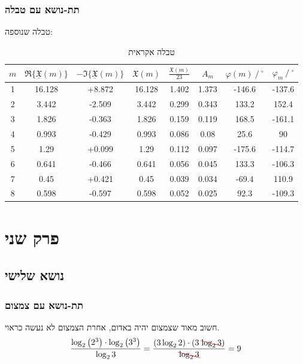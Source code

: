 \documentclass{article}
\begin{document}
\subsubsection{תת-נושא עם טבלה}
טבלה שנוספה:
\begin{center}
\begin{table}[h!]
\centering
\begin{otherlanguage}{English}
        \begin{tabular}{cccccccc} \toprule
            {$m$} & {$\Re\{\underline{\mathfrak{X}}(m)\}$} & {$-\Im\{\underline{\mathfrak{X}}(m)\}$} & {$\mathfrak{X}(m)$} & {$\frac{\mathfrak{X}(m)}{23}$} & {$A_m$} & {$\varphi(m)\ /\ ^{\circ}$} & {$\varphi_m\ /\ ^{\circ}$} \\ \midrule
            1  & 16.128 & +8.872 & 16.128 & 1.402 & 1.373 & -146.6 & -137.6 \\
            2  & 3.442  & -2.509 & 3.442  & 0.299 & 0.343 & 133.2  & 152.4  \\
            3  & 1.826  & -0.363 & 1.826  & 0.159 & 0.119 & 168.5  & -161.1 \\
            4  & 0.993  & -0.429 & 0.993  & 0.086 & 0.08  & 25.6   & 90     \\ \midrule
            5  & 1.29   & +0.099 & 1.29   & 0.112 & 0.097 & -175.6 & -114.7 \\
            6  & 0.641  & -0.466 & 0.641  & 0.056 & 0.045 & 133.3  & -106.3 \\
            7 & 0.45   & +0.421 & 0.45   & 0.039 & 0.034 & -69.4  & 110.9  \\
            8 & 0.598  & -0.597 & 0.598  & 0.052 & 0.025 & 92.3   & -109.3 \\ \bottomrule
        \end{tabular}
    \end{otherlanguage}
\caption{טבלה אקראית}
\label{תיוגטבלה1}
\end{table}
\end{center}
\section{פרק שני}
\setcounter{subsection}{2}
\subsection{נושא שלישי}
\subsubsection{תת-נושא עם צמצום}
חשוב מאוד שצמצום יהיה באדום, אחרת הצמצום לא נעשה כראוי.
\[\frac{\log_2{\left(2^{3}\right)} \cdot \log_2{\left(3^{3}\right)}}{\log_2{3}}=\frac{\left(3\log_2{2}\right)\cdot \left(3\;{\color{red}\bcancel{{\color{black}\log_2{3}}}}\right)}{{\color{red}\bcancel{{\color{black}\log_2{3}}}}}=9\]
\end{document}
